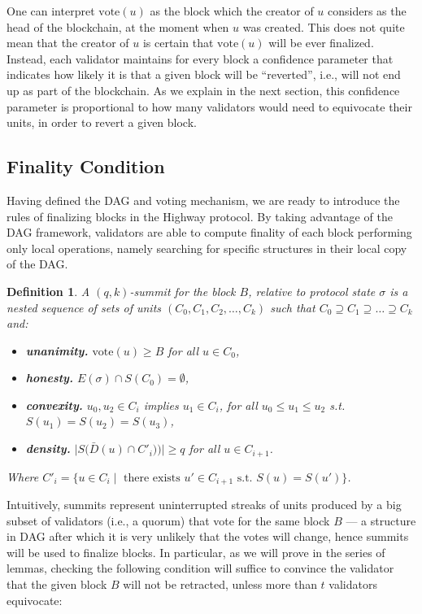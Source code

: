 \documentclass[12pt, fleqn]{article}
\newtheorem{definition}{Definition}
\newcommand{\vote}{\mathrm{vote}}
\begin{document}
One can interpret $\vote(u)$ as the block which the creator of $u$ considers as the head of the blockchain, at the moment when $u$ was created.
%
This does not quite mean that the creator of $u$ is certain that $\vote(u)$ will be ever finalized.
%
Instead, each validator maintains for every block a confidence parameter that indicates how likely it is that a given block will be ``reverted'', i.e., will not end up as part of the blockchain.
%
As we explain in the next section, this confidence parameter is proportional to how many validators would need to equivocate their units, in order to revert a given block.


\subsection{Finality Condition}\label{sec:finality}

Having defined the DAG and voting mechanism, we are ready to introduce the rules of finalizing blocks in the Highway protocol.
By taking advantage of the DAG framework, validators are able to compute finality of each block performing only local operations, namely searching for specific structures in their local copy of the DAG. 


\begin{definition}
A $(q,k)$-summit for the block $B$, relative to protocol state $\sigma$ is a nested sequence of sets of units $(C_0, C_1, C_2, \dots, C_k)$ such that $C_0\supseteq C_1 \supseteq \ldots \supseteq C_k$ and:

\begin{itemize}
  \item {\bf unanimity.} $\vote(u) \geq B$ for all $u\in C_0$,
  \item {\bf honesty.} $E(\sigma) \cap S(C_0) = \emptyset$,
  \item {\bf convexity.} $u_0, u_2 \in C_i$ implies $u_1 \in C_i$, for all $u_0  \leq u_1 \leq u_2$ s.t. $S(u_1) = S(u_2) = S(u_3)$,
  \item {\bf density.} $\big|S\big(\bar{D}(u) \cap C'_i)\big)\big| \geq q$ for all $u \in C_{i + 1}$.
\end{itemize}
Where $C'_i = \big\{u\in C_i \mid \text{ there exists } u'\in C_{i+1} \text{ s.t. } S(u) = S(u') \big\}$.
\end{definition}

Intuitively, summits represent uninterrupted streaks of units produced by a big subset of validators (i.e., a quorum) that vote for the same block $B$ --- a structure in DAG after which it is very unlikely that the votes will change, hence summits will be used to finalize blocks.
In particular, as we will prove in the series of lemmas, checking the following condition will suffice to convince the validator that the given block $B$ will not be retracted, unless more than $t$ validators equivocate:
\end{document}
